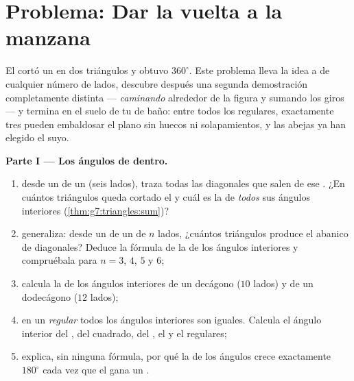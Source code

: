 \section{Problema: Dar la vuelta a la manzana}

\begin{problem}
\label{pb:g7:triangles:1}
El  cortó un  en dos triángulos
y obtuvo $360^\circ$. Este problema lleva la idea a 
de cualquier número de lados, descubre después una segunda demostración completamente
distinta --- \emph{caminando} alrededor de la figura y sumando
los giros --- y termina en el suelo de tu  de baño: entre todos los
 regulares, exactamente tres pueden embaldosar el plano sin huecos ni
solapamientos, y las abejas ya han elegido el suyo.

\medskip
\noindent\textbf{Parte I --- Los ángulos de dentro.}
\begin{enumerate}
  \item desde un  de un  (seis lados), traza todas las
        diagonales que salen de ese . ¿En cuántos triángulos queda
        cortado el  y cuál es la  de \emph{todos} sus
        ángulos interiores (\cref{thm:g7:triangles:sum})?
  \item generaliza: desde un  de un  de $n$ lados,
        ¿cuántos triángulos produce el abanico de diagonales?
        Deduce la fórmula de la  de los ángulos interiores
        y compruébala para $n = 3$, $4$, $5$ y $6$;
  \item calcula la  de los ángulos interiores de un decágono
        ($10$ lados) y de un dodecágono ($12$ lados);
  \item en un  \emph{regular} todos los ángulos interiores son
        iguales. Calcula el ángulo interior del , del cuadrado, del , el  y el
         regulares;
  \item explica, sin ninguna fórmula, por qué la  de los ángulos crece
        exactamente $180^\circ$ cada vez que el  gana un
        .
\end{enumerate}


\end{problem}
